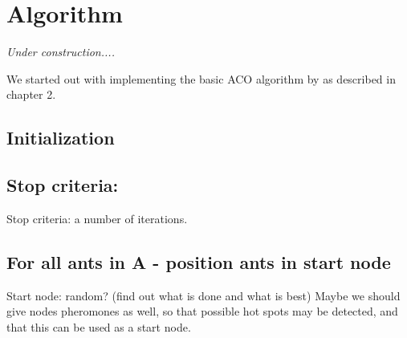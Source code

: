 \section{Algorithm}

\textit{Under construction....}

We started out with implementing the basic ACO algorithm by \citet{nanda11} as described in chapter 2.

\subsection{Initialization}

\subsection{Stop criteria:}

Stop criteria: a number of iterations. 

\subsection{For all ants in A - position ants in start node}
Start node: random? (find out what is done and what is best) Maybe we should give nodes pheromones as well, so that possible hot spots may be detected, and that this can be used as a start node. 


